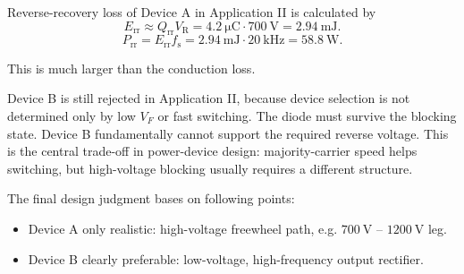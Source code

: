 \begin{solutionblock}
    Reverse-recovery loss of Device A in Application II is calculated by
    \begin{equation}
        E_\mathrm{rr} \approx Q_\mathrm{rr} V_\mathrm{R}  = \SI{4.2}{\micro\coulomb} \cdot \SI{700}{\volt} = \SI{2.94}{\milli\joule}.
    \end{equation}
    \begin{equation}
        P_\mathrm{rr} = E_\mathrm{rr} f_\mathrm{s} = \SI{2.94}{\milli\joule} \cdot \SI{20}{\kilo\hertz} = \SI{58.8}{\watt}.
    \end{equation}

    This is much larger than the conduction loss.
\end{solutionblock} 


\begin{solutionblock}
    Device B is still rejected in Application II, because device selection is not determined only by low $V_F$ or fast switching. 
    The diode must survive the blocking state. Device B fundamentally cannot support the required reverse voltage. 
    This is the central trade-off in power-device design: majority-carrier speed helps switching, 
    but high-voltage blocking usually requires a different structure.
\end{solutionblock} 


\begin{solutionblock}
    The final design judgment bases on following points:
    \begin{itemize}
        \item Device A only realistic: high-voltage freewheel path, e.g. $\SI{700}{\volt}$ -- $\SI{1200}{\volt}$ leg.
        \item Device B clearly preferable: low-voltage, high-frequency output rectifier.
    \end{itemize} 
\end{solutionblock} 




